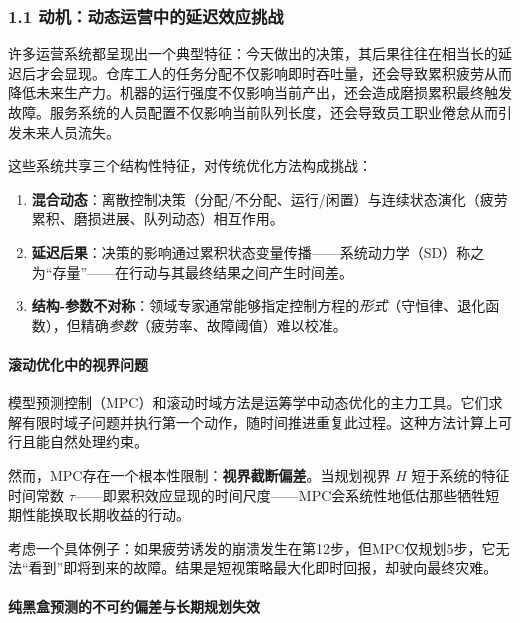 \documentclass[UTF8]{ctexart}
\let\oldparagraph\paragraph
\renewcommand{\paragraph}[1]{\oldparagraph{#1}\mbox{}}
\begin{document}
\hypertarget{ux52a8ux673aux52a8ux6001ux8fd0ux8425ux4e2dux7684ux5ef6ux8fdfux6548ux5e94ux6311ux6218}{%
\subsubsection{1.1
动机：动态运营中的延迟效应挑战}\label{ux52a8ux673aux52a8ux6001ux8fd0ux8425ux4e2dux7684ux5ef6ux8fdfux6548ux5e94ux6311ux6218}}

许多运营系统都呈现出一个典型特征：今天做出的决策，其后果往往在相当长的延迟后才会显现。仓库工人的任务分配不仅影响即时吞吐量，还会导致累积疲劳从而降低未来生产力。机器的运行强度不仅影响当前产出，还会造成磨损累积最终触发故障。服务系统的人员配置不仅影响当前队列长度，还会导致员工职业倦怠从而引发未来人员流失。

这些系统共享三个结构性特征，对传统优化方法构成挑战：

\begin{enumerate}
\def\labelenumi{\arabic{enumi}.}
\item
  \textbf{混合动态}：离散控制决策（分配/不分配、运行/闲置）与连续状态演化（疲劳累积、磨损进展、队列动态）相互作用。
\item
  \textbf{延迟后果}：决策的影响通过累积状态变量传播------系统动力学（SD）称之为``存量''------在行动与其最终结果之间产生时间差。
\item
  \textbf{结构-参数不对称}：领域专家通常能够指定控制方程的\emph{形式}（守恒律、退化函数），但精确\emph{参数}（疲劳率、故障阈值）难以校准。
\end{enumerate}

\hypertarget{ux6edaux52a8ux4f18ux5316ux4e2dux7684ux89c6ux754cux95eeux9898}{%
\paragraph{滚动优化中的视界问题}\label{ux6edaux52a8ux4f18ux5316ux4e2dux7684ux89c6ux754cux95eeux9898}}

模型预测控制（MPC）和滚动时域方法是运筹学中动态优化的主力工具。它们求解有限时域子问题并执行第一个动作，随时间推进重复此过程。这种方法计算上可行且能自然处理约束。

然而，MPC存在一个根本性限制：\textbf{视界截断偏差}。当规划视界 \(H\)
短于系统的特征时间常数
\(\tau\)------即累积效应显现的时间尺度------MPC会系统性地低估那些牺牲短期性能换取长期收益的行动。

考虑一个具体例子：如果疲劳诱发的崩溃发生在第12步，但MPC仅规划5步，它无法``看到''即将到来的故障。结果是短视策略最大化即时回报，却驶向最终灾难。

\hypertarget{ux7eafux9ed1ux76d2ux9884ux6d4bux7684ux4e0dux53efux7ea6ux504fux5deeux4e0eux957fux671fux89c4ux5212ux5931ux6548}{%
\paragraph{纯黑盒预测的不可约偏差与长期规划失效}\label{ux7eafux9ed1ux76d2ux9884ux6d4bux7684ux4e0dux53efux7ea6ux504fux5deeux4e0eux957fux671fux89c4ux5212ux5931ux6548}}
\end{document}
